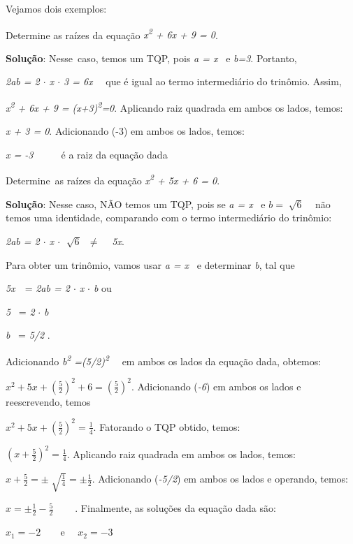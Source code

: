Vejamos dois exemplos:

\begin{texemplo}
Determine as raízes da equação   \textit{x\textsuperscript{2} + 6x + 9 = 0}.

\textbf{Solução}: Nesse~caso, temos um TQP, pois  \textit{a = x}~ e \textit{b=3}. Portanto,

\textit{2ab = 2 $ \cdot $  x $ \cdot $ 3 = 6x}~~ que é igual ao termo intermediário do trinômio. Assim,

\textit{x\textsuperscript{2} + 6x + 9 = (x+3)\textsuperscript{2}=0}. Aplicando raiz quadrada em ambos os lados, temos:

\textit{x + 3 = 0}. Adicionando (-3) em ambos os lados, temos:

\textit{x = -3~~~ }~~é a raiz da equação dada  \qedsymbol{}
\end{texemplo}

\begin{texemplo}
Determine~as raízes da equação   \textit{x\textsuperscript{2} + 5x + 6 = 0}.

\textbf{Solução}: Nesse caso, NÃO temos um TQP, pois  se \textit{a = x}~ e  \( b=\sqrt[]{6} \) ~ não temos uma identidade, comparando com o termo intermediário do trinômio:

\textit{2ab  =  2 $ \cdot $  x $ \cdot $  \( \sqrt[]{6}~  \)  $ \neq $ ~ } \textit{5x}.

Para obter um trinômio, vamos usar \textit{a = x}~ e determinar \textit{b}, tal que

\textit{5x}~~=  \textit{2ab  =  2 $ \cdot $  x} \textit{$ \cdot $  b} ou

\textit{5}~ =\textit{  2 } \textit{$ \cdot $  b}

\textit{b}~ =\textit{ 5/2 }.

Adicionando \textit{b\textsuperscript{2} =(5/2)\textsuperscript{2}}~~ em ambos os lados da equação dada, obtemos:

 \( x^{2}+5x+ \left( \frac{5}{2} \right) ^{2}+6= \left( \frac{5}{2} \right) ^{2} \). Adicionando (\textit{-6}) em ambos os lados e reescrevendo, temos

 \( x^{2}+5x+ \left( \frac{5}{2} \right) ^{2}=\frac{1}{4} \). Fatorando o TQP obtido, temos:

 \(  \left( x+\frac{5}{2} \right) ^{2}=\frac{1}{4} \). Aplicando raiz quadrada em ambos os lados, temos:

 \( x+\frac{5}{2}= \pm \sqrt[]{\frac{1}{4}}= \pm \frac{1}{2} \). Adicionando (\textit{-5/2}) em ambos os lados e operando, temos:

 \( x= \pm \frac{1}{2}-\frac{5}{2} \) \textit{~~~ }. Finalmente, as soluções da equação dada são:

 \( x_{1}=-2  \) \textit{ ~ }~ e~~  \( x_{2}=-3  \) ~~~~~ \qedsymbol{}

\end{texemplo}

